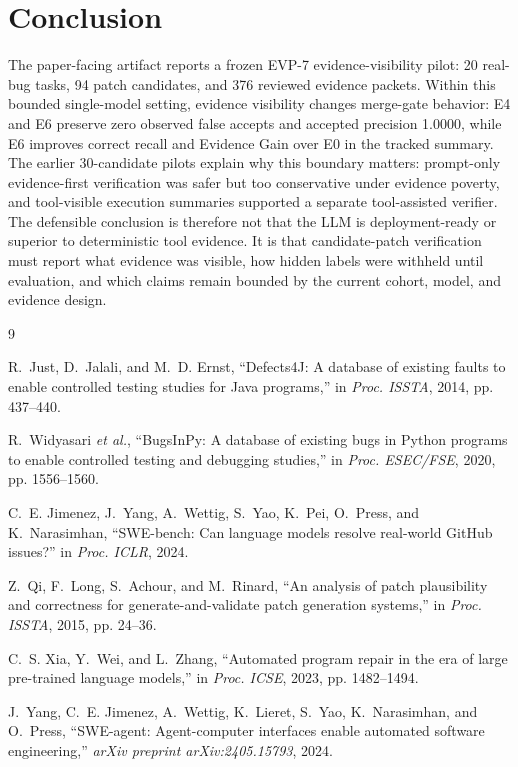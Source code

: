 \documentclass[conference]{IEEEtran}
\begin{document}
\section{Conclusion}

The paper-facing artifact reports a frozen EVP-7 evidence-visibility pilot:
20 real-bug tasks, 94 patch candidates, and
376 reviewed evidence packets. Within this bounded
single-model setting, evidence visibility changes merge-gate behavior: E4 and
E6 preserve zero observed false accepts and accepted precision 1.0000, while
E6 improves correct recall and Evidence Gain over E0 in the tracked summary.
The earlier 30-candidate pilots explain why this boundary matters:
prompt-only evidence-first verification was safer but too conservative under
evidence poverty, and tool-visible execution summaries supported a separate
tool-assisted verifier. The defensible conclusion is therefore not that the
LLM is deployment-ready or superior to deterministic tool evidence. It is that
candidate-patch verification must report what evidence was visible, how hidden
labels were withheld until evaluation, and which claims remain bounded by the
current cohort, model, and evidence design.

\begin{thebibliography}{9}

R.~Just, D.~Jalali, and M.~D. Ernst, ``Defects4J: A database of existing faults
to enable controlled testing studies for Java programs,'' in \emph{Proc. ISSTA},
2014, pp. 437--440.

R.~Widyasari \emph{et al.}, ``BugsInPy: A database of existing bugs in Python
programs to enable controlled testing and debugging studies,'' in \emph{Proc.
ESEC/FSE}, 2020, pp. 1556--1560.

C.~E. Jimenez, J.~Yang, A.~Wettig, S.~Yao, K.~Pei, O.~Press, and
K.~Narasimhan, ``SWE-bench: Can language models resolve real-world GitHub
issues?'' in \emph{Proc. ICLR}, 2024.

Z.~Qi, F.~Long, S.~Achour, and M.~Rinard, ``An analysis of patch plausibility
and correctness for generate-and-validate patch generation systems,'' in
\emph{Proc. ISSTA}, 2015, pp. 24--36.

C.~S. Xia, Y.~Wei, and L.~Zhang, ``Automated program repair in the era of large
pre-trained language models,'' in \emph{Proc. ICSE}, 2023, pp. 1482--1494.

J.~Yang, C.~E. Jimenez, A.~Wettig, K.~Lieret, S.~Yao, K.~Narasimhan, and
O.~Press, ``SWE-agent: Agent-computer interfaces enable automated software
engineering,'' \emph{arXiv preprint arXiv:2405.15793}, 2024.

\end{thebibliography}
\end{document}

